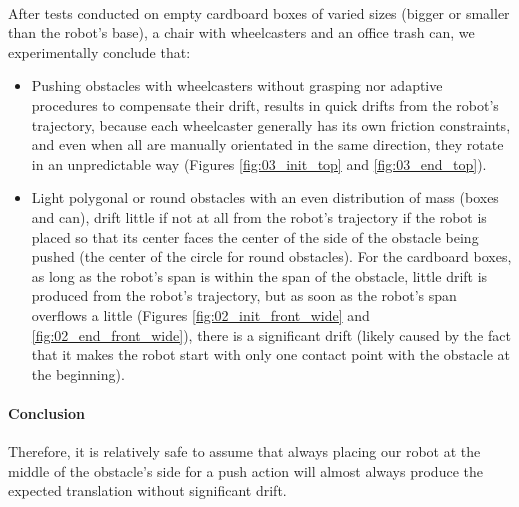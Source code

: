 \paragraph{} After tests conducted on empty cardboard boxes of varied sizes (bigger or smaller than the robot's base), a chair with wheelcasters and an office trash can, we experimentally conclude that:
\begin{itemize}
  \item Pushing obstacles with wheelcasters without grasping nor adaptive procedures to compensate their drift, results in quick drifts from the robot's trajectory, because each wheelcaster generally has its own friction constraints, and even when all are manually orientated in the same direction, they rotate in an unpredictable way (Figures \ref{fig:03_init_top} and \ref{fig:03_end_top}).
  \item Light polygonal or round obstacles with an even distribution of mass (boxes and can), drift little if not at all from the robot's trajectory if the robot is placed so that its center faces the center of the side of the obstacle being pushed (the center of the circle for round obstacles). For the cardboard boxes, as long as the robot's span is within the span of the obstacle, little drift is produced from the robot's trajectory, but as soon as the robot's span overflows a little (Figures \ref{fig:02_init_front_wide} and \ref{fig:02_end_front_wide}), there is a significant drift (likely caused by the fact that it makes the robot start with only one contact point with the obstacle at the beginning).
\end{itemize}

\paragraph{Conclusion} Therefore, it is relatively safe to assume that always placing our robot at the middle of the obstacle's side for a push action will almost always produce the expected translation without significant drift.

